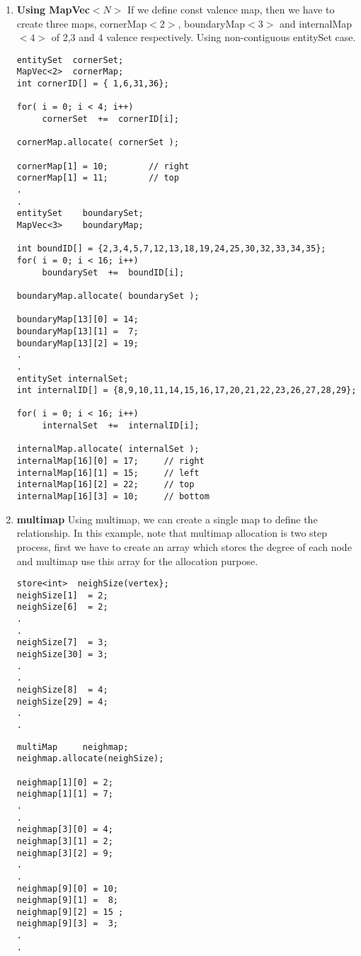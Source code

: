 \begin{enumerate}
\begin{verbatim}
for( entitySet:: const_iterator ei = northSet.begin(); ei != northSet.end(); ei++)
     northmap[*e1] = *e1 + xnodes;

// Define South  map
entitySet    southSet = allnodes;

southSet -= 1;
southSet -= 2;
southSet -= 3;
southSet -= 4;
southSet -= 5;
southSet -= 6;

southmap.allocate( southSet );

for( entitySet:: const_iterator ei = southSet.begin(); ei != southSet.end(); ei++)
     southmap[*e1] = *e1 - xnodes;

\end{verbatim}
%
\item {\bf Using MapVec$<N>$ }  If we define const valence map, then we have to 
create three maps, cornerMap$<2>$, boundaryMap$<3>$ and internalMap$<4>$ of 2,3 and
4 valence respectively.  Using non-contiguous entitySet case.
\begin{verbatim}
entitySet  cornerSet;
MapVec<2>  cornerMap;
int cornerID[] = { 1,6,31,36};

for( i = 0; i < 4; i++)
     cornerSet  +=  cornerID[i];

cornerMap.allocate( cornerSet );

cornerMap[1] = 10;        // right
cornerMap[1] = 11;        // top
.
.
entitySet    boundarySet;
MapVec<3>    boundaryMap;

int boundID[] = {2,3,4,5,7,12,13,18,19,24,25,30,32,33,34,35};
for( i = 0; i < 16; i++)
     boundarySet  +=  boundID[i];

boundaryMap.allocate( boundarySet );

boundaryMap[13][0] = 14; 
boundaryMap[13][1] =  7; 
boundaryMap[13][2] = 19; 
.
.
entitySet internalSet;
int internalID[] = {8,9,10,11,14,15,16,17,20,21,22,23,26,27,28,29};

for( i = 0; i < 16; i++)
     internalSet  +=  internalID[i];

internalMap.allocate( internalSet );
internalMap[16][0] = 17;     // right
internalMap[16][1] = 15;     // left
internalMap[16][2] = 22;     // top
internalMap[16][3] = 10;     // bottom
\end{verbatim}
%
\item {\bf multimap}  Using multimap, we can create a single map to define the
relationship. In this example, note that multimap allocation is two step process,
first we have to create an array which stores the degree of each node and multimap
use this array for the allocation purpose.
%
\begin{verbatim}
store<int>  neighSize(vertex};
neighSize[1]  = 2;
neighSize[6]  = 2;
.
.
neighSize[7]  = 3;
neighSize[30] = 3;
.
.
neighSize[8]  = 4;
neighSize[29] = 4;
.
.
\end{verbatim}
%
\begin{verbatim}
multiMap     neighmap;
neighmap.allocate(neighSize);

neighmap[1][0] = 2;
neighmap[1][1] = 7;
.
.
neighmap[3][0] = 4;
neighmap[3][1] = 2;
neighmap[3][2] = 9;
.
.
neighmap[9][0] = 10;
neighmap[9][1] =  8;
neighmap[9][2] = 15 ;
neighmap[9][3] =  3;
.
.
\end{verbatim}
\end{enumerate}

